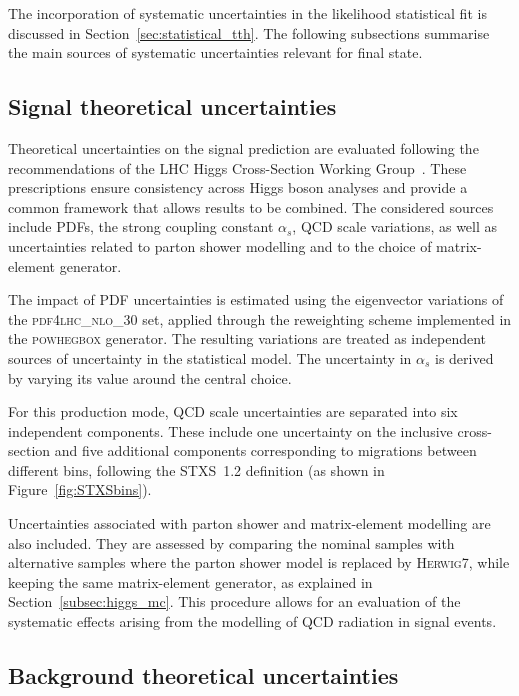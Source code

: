 The incorporation of systematic uncertainties in the likelihood statistical fit is discussed in Section~\ref{sec:statistical_tth}. The following subsections summarise the main sources of systematic uncertainties relevant for \ttHtt final state.

\subsection{Signal theoretical uncertainties}
\label{subsec:signal_theo_syst}

Theoretical uncertainties on the \ttH signal prediction are evaluated following the recommendations of the LHC Higgs Cross-Section Working Group~\cite{https://doi.org/10.23731/cyrm-2017-002, https://doi.org/10.5170/cern-2013-004}. These prescriptions ensure consistency across Higgs boson analyses and provide a common framework that allows results to be combined. The considered sources include PDFs, the strong coupling constant $\alpha_{s}$, QCD scale variations, as well as uncertainties related to parton shower modelling and to the choice of matrix-element generator.  

The impact of PDF uncertainties is estimated using the eigenvector variations of the \textsc{pdf4lhc\_nlo\_30} set, applied through the reweighting scheme implemented in the \textsc{powhegbox} generator. The resulting variations are treated as independent sources of uncertainty in the statistical model. The uncertainty in $\alpha_{s}$ is derived by varying its value around the central choice. 

For this production mode, QCD scale uncertainties are separated into six independent components. These include one uncertainty on the inclusive cross-section and five additional components corresponding to migrations between different \pth bins, following the STXS~1.2 definition (as shown in Figure~\ref{fig:STXSbins}).

Uncertainties associated with parton shower and matrix-element modelling are also included. They are assessed by comparing the nominal samples with alternative samples where the parton shower model is replaced by \textsc{Herwig7}, while keeping the same matrix-element generator, as explained in Section~\ref{subsec:higgs_mc}. This procedure allows for an evaluation of the systematic effects arising from the modelling of QCD radiation in \ttH signal events.

\subsection{Background theoretical uncertainties}
\label{subsec:bkg_theo_syst}

